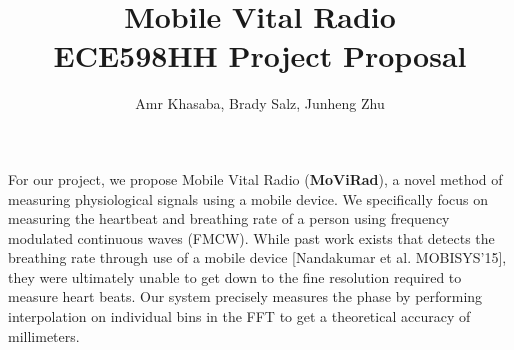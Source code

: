 

\title{\textbf{Mobile Vital Radio} \\{\large ECE598HH Project Proposal} }

\author{Amr Khasaba, Brady Salz, Junheng Zhu}
\date{}

\maketitle

For our project, we propose Mobile Vital Radio (\textbf{MoViRad}), a novel method of measuring physiological signals using a mobile device. We specifically focus on measuring the heartbeat and breathing rate of a person using frequency modulated continuous waves (FMCW). While past work exists that detects the breathing rate through use of a mobile device [Nandakumar et al. MOBISYS’15], they were ultimately unable to get down to the fine resolution required to measure heart beats. Our system precisely measures the phase by performing interpolation on individual bins in the FFT to get a theoretical accuracy of millimeters. 


